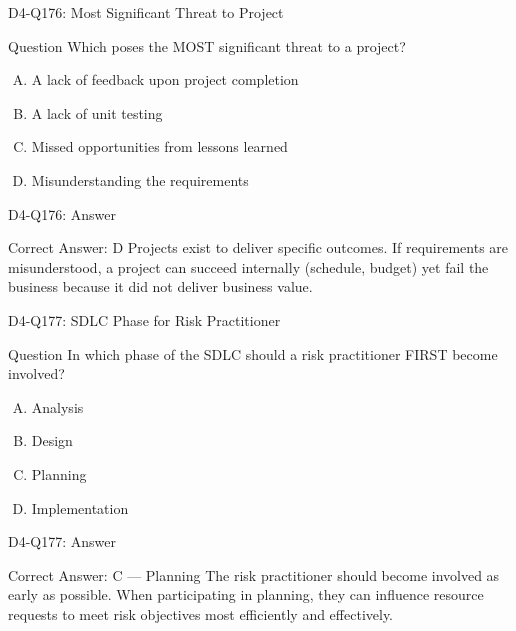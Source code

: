 \documentclass{beamer}
\begin{document}
	\begin{frame}{D4-Q176: Most Significant Threat to Project}
		\begin{block}{Question}
			Which poses the MOST significant threat to a project?
		\end{block}
		\begin{enumerate}[(A)]
			\item A lack of feedback upon project completion
			\item A lack of unit testing
			\item Missed opportunities from lessons learned
			\item Misunderstanding the requirements
		\end{enumerate}
	\end{frame}
	\begin{frame}{D4-Q176: Answer}
		\begin{block}{Correct Answer: D}
			Projects exist to deliver specific outcomes. If requirements are misunderstood, a project can succeed internally (schedule, budget) yet fail the business because it did not deliver business value.
		\end{block}
	\end{frame}
	
	\begin{frame}{D4-Q177: SDLC Phase for Risk Practitioner}
		\begin{block}{Question}
			In which phase of the SDLC should a risk practitioner FIRST become involved?
		\end{block}
		\begin{enumerate}[(A)]
			\item Analysis
			\item Design
			\item Planning
			\item Implementation
		\end{enumerate}
	\end{frame}
	\begin{frame}{D4-Q177: Answer}
		\begin{block}{Correct Answer: C --- Planning}
			The risk practitioner should become involved as early as possible. When participating in planning, they can influence resource requests to meet risk objectives most efficiently and effectively.
		\end{block}
	\end{frame}
	
\end{document}

